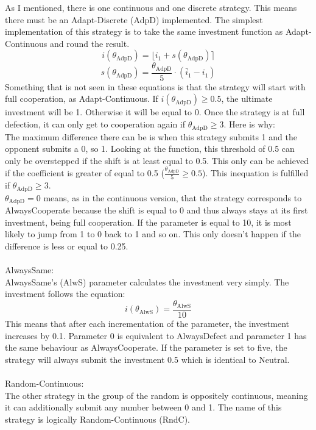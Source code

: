 \documentclass{article}
\newcommand{\round}[1]{\ensuremath{\lfloor#1\rceil}}
\begin{document}
As I mentioned, there is one continuous and one discrete strategy.
This means there must be an Adapt-Discrete (AdpD) implemented.
The simplest implementation of this strategy is to take the same investment function as Adapt-Continuous and round the result.
$$i(\theta_{\mathrm{AdpD}}) = \round{i_1 + s(\theta_{\mathrm{AdpD}})}$$
$$s(\theta_{\mathrm{AdpD}}) = \frac{\theta_{\mathrm{AdpD}}}{5} \cdot (\bar i_1 - i_1)$$
Something that is not seen in these equations is that the strategy will start with full cooperation, as Adapt-Continuous.
If $i(\theta_{\mathrm{AdpD}}) \ge 0.5$, the ultimate investment will be 1.
Otherwise it will be equal to 0.
Once the strategy is at full defection, it can only get to cooperation again if $\theta_{\mathrm{AdpD}} \ge 3$.
Here is why:\\
The maximum difference there can be is when this strategy submits 1 and the opponent submits a 0, so 1.
Looking at the function, this threshold of 0.5 can only be overstepped if the shift is at least equal to 0.5.
This only can be achieved if the coefficient is greater of equal to 0.5 ($\frac{\theta_{\mathrm{AdpD}}}{5} \ge 0.5$).
This inequation is fulfilled if $\theta_{\mathrm{AdpD}} \ge 3$.\\
$\theta_{\mathrm{AdpD}} = 0$ means, as in the continuous version, that the strategy corresponds to AlwaysCooperate because the shift is equal to 0 and thus always stays at its first investment, being full cooperation.
If the parameter is equal to 10, it is most likely to jump from 1 to 0 back to 1 and so on.
This only doesn't happen if the difference is less or equal to 0.25.\\
		\\AlwaysSame:\\
AlwaysSame's (AlwS) parameter calculates the investment very simply.
The investment follows the equation: 
$$i(\theta_{\mathrm{AlwS}}) = \frac{\theta_{\mathrm{AlwS}}}{10}$$
This means that after each incrementation of the parameter, the investment increases by 0.1.
Parameter 0 is equivalent to AlwaysDefect and parameter 1 has the same behaviour as AlwaysCooperate.
If the parameter is set to five, the strategy will always submit the investment 0.5 which is identical to Neutral.\\
		\\Random-Continuous:\\
The other strategy in the group of the random is oppositely continuous, meaning it can additionally submit any number between 0 and 1.
The name of this strategy is logically Random-Continuous (RndC).
\end{document}
